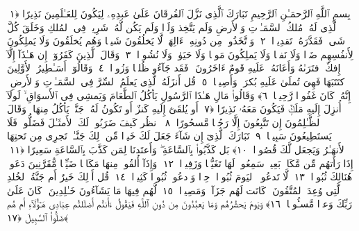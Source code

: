 
  
    
  
    
    

\nopagebreak
  بِسمِ ٱللَّهِ ٱلرَّحمَـٰنِ ٱلرَّحِيمِ
  تَبَارَكَ ٱلَّذِى نَزَّلَ ٱلفُرقَانَ عَلَىٰ عَبدِهِۦ لِيَكُونَ لِلعَـٰلَمِينَ نَذِيرًا ﴿١﴾
 ٱلَّذِى لَهُۥ مُلكُ ٱلسَّمَـٰوَٟتِ وَٱلأَرضِ وَلَم يَتَّخِذ وَلَدًۭا وَلَم يَكُن لَّهُۥ شَرِيكٌۭ فِى ٱلمُلكِ وَخَلَقَ كُلَّ شَىءٍۢ فَقَدَّرَهُۥ تَقدِيرًۭا ﴿٢﴾
 وَٱتَّخَذُوا۟ مِن دُونِهِۦٓ ءَالِهَةًۭ لَّا يَخلُقُونَ شَيـًۭٔا وَهُم يُخلَقُونَ وَلَا يَملِكُونَ لِأَنفُسِهِم ضَرًّۭا وَلَا نَفعًۭا وَلَا يَملِكُونَ مَوتًۭا وَلَا حَيَوٰةًۭ وَلَا نُشُورًۭا ﴿٣﴾
 وَقَالَ ٱلَّذِينَ كَفَرُوٓا۟ إِن هَـٰذَآ إِلَّآ إِفكٌ ٱفتَرَىٰهُ وَأَعَانَهُۥ عَلَيهِ قَومٌ ءَاخَرُونَ ۖ فَقَد جَآءُو ظُلمًۭا وَزُورًۭا ﴿٤﴾
 وَقَالُوٓا۟ أَسَـٰطِيرُ ٱلأَوَّلِينَ ٱكتَتَبَهَا فَهِىَ تُملَىٰ عَلَيهِ بُكرَةًۭ وَأَصِيلًۭا ﴿٥﴾
 قُل أَنزَلَهُ ٱلَّذِى يَعلَمُ ٱلسِّرَّ فِى ٱلسَّمَـٰوَٟتِ وَٱلأَرضِ ۚ إِنَّهُۥ كَانَ غَفُورًۭا رَّحِيمًۭا ﴿٦﴾
 وَقَالُوا۟ مَالِ هَـٰذَا ٱلرَّسُولِ يَأكُلُ ٱلطَّعَامَ وَيَمشِى فِى ٱلأَسوَاقِ ۙ لَولَآ أُنزِلَ إِلَيهِ مَلَكٌۭ فَيَكُونَ مَعَهُۥ نَذِيرًا ﴿٧﴾
 أَو يُلقَىٰٓ إِلَيهِ كَنزٌ أَو تَكُونُ لَهُۥ جَنَّةٌۭ يَأكُلُ مِنهَا ۚ وَقَالَ ٱلظَّـٰلِمُونَ إِن تَتَّبِعُونَ إِلَّا رَجُلًۭا مَّسحُورًا ﴿٨﴾
 ٱنظُر كَيفَ ضَرَبُوا۟ لَكَ ٱلأَمثَـٰلَ فَضَلُّوا۟ فَلَا يَستَطِيعُونَ سَبِيلًۭا ﴿٩﴾
 تَبَارَكَ ٱلَّذِىٓ إِن شَآءَ جَعَلَ لَكَ خَيرًۭا مِّن ذَٟلِكَ جَنَّـٰتٍۢ تَجرِى مِن تَحتِهَا ٱلأَنهَـٰرُ وَيَجعَل لَّكَ قُصُورًۢا ﴿١٠﴾
 بَل كَذَّبُوا۟ بِٱلسَّاعَةِ ۖ وَأَعتَدنَا لِمَن كَذَّبَ بِٱلسَّاعَةِ سَعِيرًا ﴿١١﴾
 إِذَا رَأَتهُم مِّن مَّكَانٍۭ بَعِيدٍۢ سَمِعُوا۟ لَهَا تَغَيُّظًۭا وَزَفِيرًۭا ﴿١٢﴾
 وَإِذَآ أُلقُوا۟ مِنهَا مَكَانًۭا ضَيِّقًۭا مُّقَرَّنِينَ دَعَوا۟ هُنَالِكَ ثُبُورًۭا ﴿١٣﴾
 لَّا تَدعُوا۟ ٱليَومَ ثُبُورًۭا وَٟحِدًۭا وَٱدعُوا۟ ثُبُورًۭا كَثِيرًۭا ﴿١٤﴾
 قُل أَذَٟلِكَ خَيرٌ أَم جَنَّةُ ٱلخُلدِ ٱلَّتِى وُعِدَ ٱلمُتَّقُونَ ۚ كَانَت لَهُم جَزَآءًۭ وَمَصِيرًۭا ﴿١٥﴾
 لَّهُم فِيهَا مَا يَشَآءُونَ خَـٰلِدِينَ ۚ كَانَ عَلَىٰ رَبِّكَ وَعدًۭا مَّسـُٔولًۭا ﴿١٦﴾
 وَيَومَ يَحشُرُهُم وَمَا يَعبُدُونَ مِن دُونِ ٱللَّهِ فَيَقُولُ ءَأَنتُم أَضلَلتُم عِبَادِى هَـٰٓؤُلَآءِ أَم هُم ضَلُّوا۟ ٱلسَّبِيلَ ﴿١٧﴾

